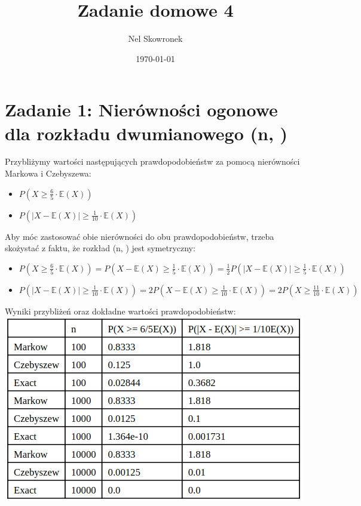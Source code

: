 \documentclass{article}
\title{Zadanie domowe 4}
\author{Nel Skowronek}
\date{\today}
\begin{document}
\maketitle

\section*{Zadanie 1: Nierówności ogonowe dla rozkładu dwumianowego \left(n, \right)}

Przybliżymy wartości następujących prawdopodobieństw za pomocą nierówności Markowa i Czebyszewa:
\begin{itemize}
    \item \( P\left(X \geq \frac{6}{5} \cdot \mathbb{E}(X)\right) \)
    \item \( P\left(\left|X - \mathbb{E}(X)\right| \geq \frac{1}{10} \cdot \mathbb{E}(X) \right) \)
\end{itemize}
Aby móc zastosować obie nierówności do obu prawdopodobieństw, trzeba skożystać z faktu, że rozkład \left(n, \right) jest symetryczny:
\begin{itemize}
    \item \( P\left(X \geq \frac{6}{5} \cdot \mathbb{E}(X)\right) = P\left(X - \mathbb{E}(X) \geq \frac{1}{5} \cdot \mathbb{E}(X)\right) = \frac{1}{2}P\left(\left|X - \mathbb{E}(X)\right| \geq \frac{1}{5} \cdot \mathbb{E}(X)\right) \)
    \item \( P\left(\left|X - \mathbb{E}(X) \right| \geq \frac{1}{10} \cdot \mathbb{E}(X) \right) = 2P\left(X - \mathbb{E}(X) \geq \frac{1}{10} \cdot \mathbb{E}(X) \right) = 2P\left(X \geq \frac{11}{10} \cdot \mathbb{E}(X) \right) \)
\end{itemize}

Wyniki przybliżeń oraz dokładne wartości prawdopodobieństw:
\hspace*{-0cm} \includegraphics[scale=0.5]{./plots/exc1.png}
\end{document}
